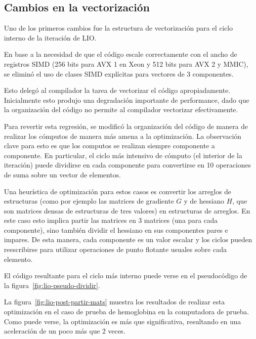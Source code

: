 
\subsection{Cambios en la vectorizaci\'on}

Uno de los primeros cambios fue la estructura de vectorizaci\'on para el ciclo
interno de la iteraci\'on de LIO.

En base a la necesidad de que el c\'odigo escale correctamente con el ancho de registros
SIMD (256 bits para AVX 1 en Xeon y 512 bits para AVX 2 y MMIC), se elimin\'o el
uso de clases SIMD expl\'icitas para vectores de 3 componentes.

Esto deleg\'o al compilador la tarea de vectorizar el c\'odigo apropiadamente. Inicialmente
esto produjo una degradaci\'on importante de performance, dado que la organizaci\'on del
c\'odigo no permite al compilador vectorizar efectivamente.

Para revertir esta regresi\'on, se modific\'o la organizaci\'on del c\'odigo de manera de
realizar los c\'omputos de manera m\'as amena a la optimizaci\'on. La observaci\'on clave
para esto es que los computos se realizan siempre componente a componente. En particular,
el ciclo m\'as intensivo de c\'omputo (el interior de la iteraci\'on) puede dividirse
en cada componente para convertirse en 10 operaciones de suma sobre un vector de
elementos.

Una heur\'istica de optimizaci\'on para estos casos es convertir los arreglos de
estructuras (como por ejemplo las matrices de gradiente $G$ y de hessiano $H$, que
son matrices densas de estructuras de tres valores) en estructuras de arreglos.
En este caso esto implica partir las matrices en 3 matrices (una para cada
componente), sino tambi\'en dividir el hessiano en sus componentes pares e impares.
De esta manera, cada componente es un valor escalar y los ciclos pueden reescribirse
para utilizar operaciones de punto flotante usuales sobre cada elemento.

El c\'odigo resultante para el ciclo m\'as interno puede verse en el pseudoc\'odigo
de la figura~\ref{fig:lio-pseudo-dividir}.


La figura~\ref{fig:lio-post-partir-mats} muestra los resultados de realizar esta
optimizaci\'on en el caso de prueba de hemoglobina en la computadora de prueba.
Como puede verse, la optimizaci\'on es m\'as que significativa, resultando en
una aceleraci\'on de un poco m\'as que 2 veces.

